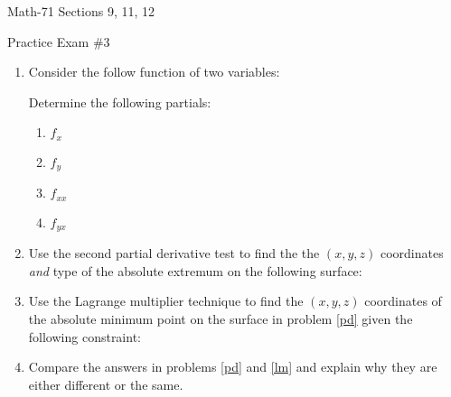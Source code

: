 \documentclass[letterpaper,12pt,fleqn]{article}
\begin{document}
\begin{center}
  \large
  Math-71 Sections 9, 11, 12

  \Large
  Practice Exam \#3
\end{center}

\vspace{0.5in}

\begin{enumerate}[left=0pt]
\item Consider the follow function of two variables:

  \bigskip

  \begin{center}
  \end{center}
  
  \bigskip

  Determine the following partials:
  \begin{enumerate}[label={\alph*)}]
  \item \(f_x\)
  \item \(f_y\)
  \item \(f_{xx}\)
  \item \(f_{yx}\)
  \end{enumerate}

\item{\label{pd}} Use the second partial derivative test to find the the \((x,y,z)\) coordinates \emph{and} type of the
  absolute extremum on the following surface:

  \bigskip

  \begin{center}
    \scalebox{1.25}{\(\displaystyle z=5-x^2-2x-y^2+4y\)}
  \end{center}

  \bigskip

\item{\label{lm}} Use the Lagrange multiplier technique to find the \((x,y,z)\) coordinates of the absolute minimum
  point on the surface in problem \ref{pd} given the following constraint:

  \bigskip

  \begin{center}
    \scalebox{1.25}{\(\displaystyle 2x-y+4=0\)}
  \end{center}

  \bigskip

\item Compare the answers in problems \ref{pd} and \ref{lm} and explain why they are either different or the same.


\end{enumerate}
\end{document}
